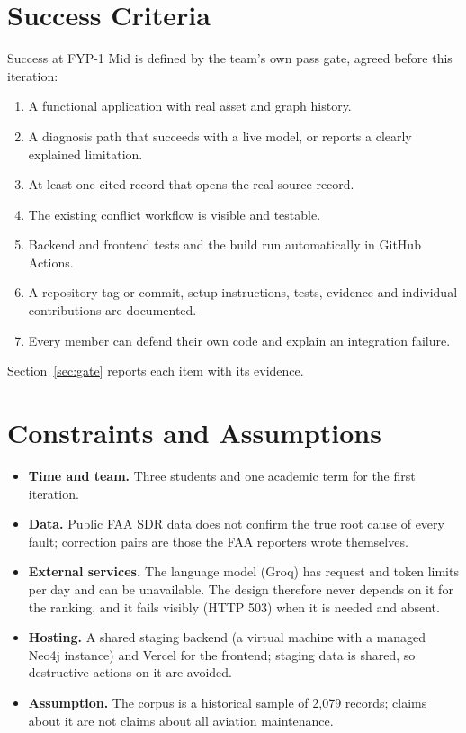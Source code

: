 \section{Success Criteria}
Success at FYP-1 Mid is defined by the team's own pass gate, agreed before this iteration:
\begin{enumerate}[label=\textbf{\Alph*.}]
\item A functional application with real asset and graph history.
\item A diagnosis path that succeeds with a live model, or reports a clearly explained limitation.
\item At least one cited record that opens the real source record.
\item The existing conflict workflow is visible and testable.
\item Backend and frontend tests and the build run automatically in GitHub Actions.
\item A repository tag or commit, setup instructions, tests, evidence and individual contributions are documented.
\item Every member can defend their own code and explain an integration failure.
\end{enumerate}
Section~\ref{sec:gate} reports each item with its evidence.

\section{Constraints and Assumptions}
\begin{itemize}
\item \textbf{Time and team.} Three students and one academic term for the first iteration.
\item \textbf{Data.} Public FAA SDR data does not confirm the true root cause of every fault; correction pairs are those the FAA reporters wrote themselves.
\item \textbf{External services.} The language model (Groq) has request and token limits per day and can be unavailable. The design therefore never depends on it for the ranking, and it fails visibly (HTTP 503) when it is needed and absent.
\item \textbf{Hosting.} A shared staging backend (a virtual machine with a managed Neo4j instance) and Vercel for the frontend; staging data is shared, so destructive actions on it are avoided.
\item \textbf{Assumption.} The corpus is a historical sample of 2,079 records; claims about it are not claims about all aviation maintenance.
\end{itemize}

